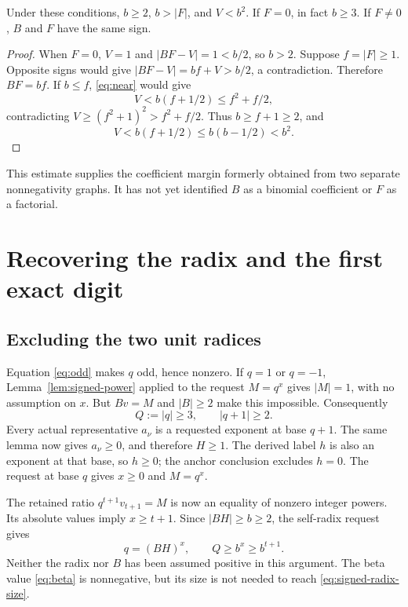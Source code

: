 \begin{lemma}\label{lem:early-bound}
Under these conditions, \(b\ge2\), \(b>|F|\), and \(V<b^2\).
If \(F=0\), in fact \(b\ge3\). If \(F\ne0\), \(B\) and \(F\)
have the same sign.
\end{lemma}

\begin{proof}
When \(F=0\), \(V=1\) and \(|BF-V|=1<b/2\), so \(b>2\).
Suppose \(f=|F|\ge1\). Opposite signs would give
\(|BF-V|=bf+V>b/2\), a contradiction. Therefore \(BF=bf\).
If \(b\le f\), \eqref{eq:near} would give
\[
 V<b(f+1/2)\le f^2+f/2,
\]
contradicting \(V\ge(f^2+1)^2>f^2+f/2\).
Thus \(b\ge f+1\ge2\), and
\[
 V<b(f+1/2)\le b(b-1/2)<b^2.
\]
\end{proof}

This estimate supplies the coefficient margin formerly obtained from
two separate nonnegativity graphs. It has not yet identified \(B\)
as a binomial coefficient or \(F\) as a factorial.

\section{Recovering the radix and the first exact digit}

\subsection{Excluding the two unit radices}

Equation \eqref{eq:odd} makes \(q\) odd, hence nonzero. If \(q=1\)
or \(q=-1\), Lemma~\ref{lem:signed-power} applied to the request
\(M=q^x\) gives \(|M|=1\), with no assumption on \(x\).
But \(Bv=M\) and \(|B|\ge2\) make this impossible. Consequently
\[
 Q:=|q|\ge3,\qquad |q+1|\ge2.
\]
Every actual representative \(a_\nu\) is a requested exponent at
base \(q+1\). The same lemma now gives \(a_\nu\ge0\), and therefore
\(H\ge1\). The derived label \(h\) is also an exponent at that base,
so \(h\ge0\); the anchor conclusion excludes \(h=0\).
The request at base \(q\) gives \(x\ge0\) and \(M=q^x\).

The retained ratio \(q^{t+1}v_{t+1}=M\) is now an equality of
nonzero integer powers. Its absolute values imply \(x\ge t+1\).
Since \(|BH|\ge b\ge2\), the self-radix request gives
\begin{equation}\label{eq:signed-radix-size}
 q=(BH)^x,\qquad Q\ge b^x\ge b^{t+1}.
\end{equation}
Neither the radix nor \(B\) has been assumed positive in this argument.
The beta value \eqref{eq:beta} is nonnegative, but its size is not
needed to reach \eqref{eq:signed-radix-size}.

